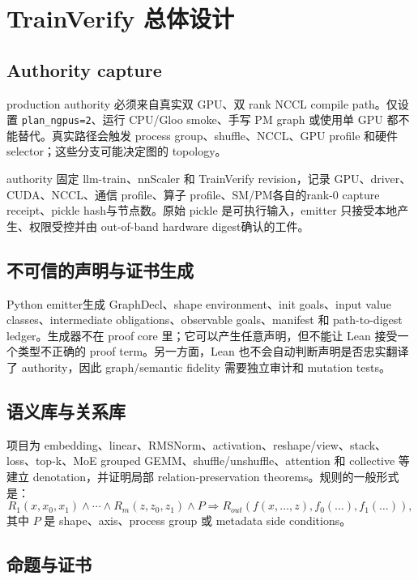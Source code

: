 \documentclass[10.5pt,a4paper]{ctexart}
\newcommand{\code}[1]{\texttt{#1}}
\begin{document}
\section{TrainVerify 总体设计}

\subsection{Authority capture}

production authority 必须来自真实双 GPU、双 rank NCCL compile path。仅设置 \code{plan\_ngpus=2}、运行 CPU/Gloo smoke、手写 PM graph 或使用单 GPU 都不能替代。真实路径会触发 process group、shuffle、NCCL、GPU profile 和硬件 selector；这些分支可能决定图的 topology。

authority 固定 llm-train、nnScaler 和 TrainVerify revision，记录 GPU、driver、CUDA、NCCL、通信 profile、算子 profile、SM/PM各自的rank-0 capture receipt、pickle hash与节点数。原始 pickle 是可执行输入，emitter 只接受本地产生、权限受控并由 out-of-band hardware digest确认的工件。

\subsection{不可信的声明与证书生成}

Python emitter生成 GraphDecl、shape environment、init goals、input value classes、intermediate obligations、observable goals、manifest 和 path-to-digest ledger。生成器不在 proof core 里；它可以产生任意声明，但不能让 Lean 接受一个类型不正确的 proof term。另一方面，Lean 也不会自动判断声明是否忠实翻译了 authority，因此 graph/semantic fidelity 需要独立审计和 mutation tests。

\subsection{语义库与关系库}

项目为 embedding、linear、RMSNorm、activation、reshape/view、stack、loss、top-k、MoE grouped GEMM、shuffle/unshuffle、attention 和 collective 等建立 denotation，并证明局部 relation-preservation theorems。规则的一般形式是：
\[
R_1(x,x_0,x_1)\land\cdots\land R_m(z,z_0,z_1)\land P
\Rightarrow
R_{out}(f(x,\ldots,z), f_0(\ldots), f_1(\ldots)),
\]
其中 $P$ 是 shape、axis、process group 或 metadata side conditions。

\subsection{命题与证书}
\end{document}
